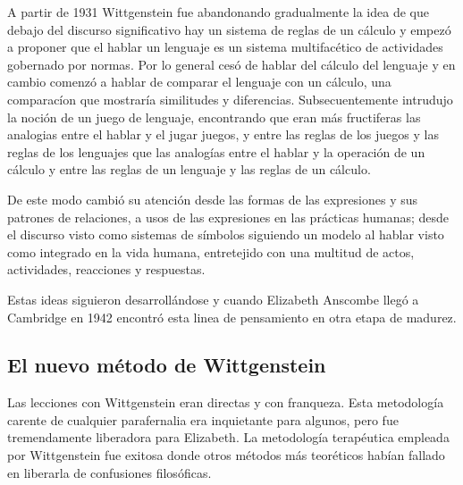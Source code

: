 A partir de 1931 Wittgenstein fue abandonando gradualmente la idea de que debajo
del discurso significativo hay un sistema de reglas de un cálculo y empezó a
proponer que el hablar un lenguaje es un sistema multifacético de actividades
gobernado por normas. Por lo general cesó de hablar del cálculo del lenguaje y
en cambio comenzó a hablar de comparar el lenguaje con un cálculo, una
comparacíon que mostraría similitudes y diferencias. Subsecuentemente intrudujo
la noción de un juego de lenguaje, encontrando que eran más fructiferas las
analogias entre el hablar y el jugar juegos, y entre las reglas de los juegos y
las reglas de los lenguajes que las analogías entre el hablar y la operación de
un cálculo y entre las reglas de un lenguaje y las reglas de un cálculo.

De este modo cambió su atención desde las formas de las expresiones y sus
patrones de relaciones, a usos de las expresiones en las prácticas humanas;
desde el discurso visto como sistemas de símbolos siguiendo un modelo al
hablar visto como integrado en la vida humana, entretejido con una multitud de
actos, actividades, reacciones y respuestas.

Estas ideas siguieron desarrollándose y cuando Elizabeth Anscombe llegó a
Cambridge en 1942 encontró esta linea de pensamiento en otra etapa de madurez.

\subsection{El nuevo método de Wittgenstein}
Las lecciones con Wittgenstein eran directas y con franqueza. Esta metodología
carente de cualquier parafernalia era inquietante para algunos, pero fue
tremendamente liberadora para Elizabeth. La metodología terapéutica empleada por
Wittgenstein fue exitosa donde otros métodos más teoréticos habían fallado en
liberarla de confusiones filosóficas.\autocite[loc 9853 Chapter 4, Section 24,
\S5]{monk}


